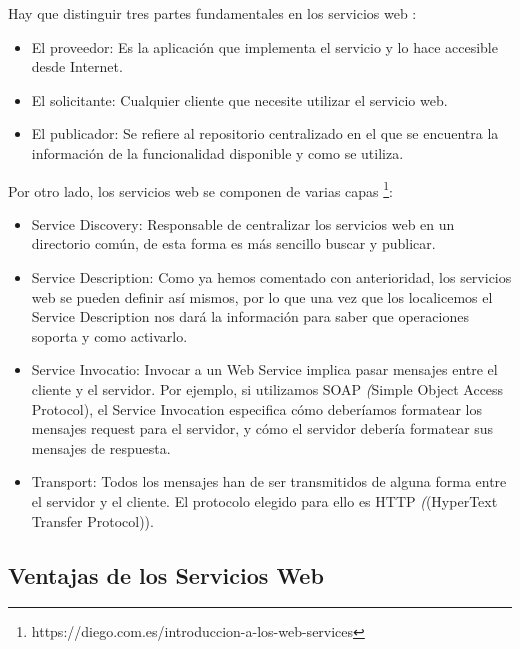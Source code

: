Hay que distinguir tres partes fundamentales en los servicios web \citep{TorresJoaquin2017SC}:
\begin{itemize}
	\item El proveedor: Es la aplicación que implementa el servicio y lo hace accesible desde Internet.
	\item El solicitante: Cualquier cliente que necesite utilizar el servicio web.
	\item El publicador: Se refiere al repositorio centralizado en el que se encuentra la información de la funcionalidad disponible y como se utiliza.
	
\end{itemize}
Por otro lado, los servicios web se componen de varias capas \footnote{https://diego.com.es/introduccion-a-los-web-services}:
\begin{itemize}
	\item Service Discovery: Responsable de centralizar los servicios web en un directorio común, de esta forma es más sencillo buscar y publicar.
	\item Service Description: Como ya hemos comentado con anterioridad, los servicios web se pueden definir así mismos, por lo que una vez que los localicemos el Service Description nos dará la información para saber que operaciones soporta y como activarlo.
	\item Service Invocatio: Invocar a un Web Service implica pasar mensajes entre el cliente y el servidor. Por ejemplo, si utilizamos SOAP  \textit({Simple Object Access Protocol}), el Service Invocation especifica cómo deberíamos formatear los mensajes request para el servidor, y cómo el servidor debería formatear sus mensajes de respuesta.
	\item Transport: Todos los mensajes han de ser transmitidos de alguna forma entre el servidor y el cliente. El protocolo elegido para ello es HTTP  \textit({(HyperText Transfer Protocol)}). 
\end{itemize}



\subsection{Ventajas de los  Servicios Web}
\label{cap:subsec:ventajasserviciosweb}

